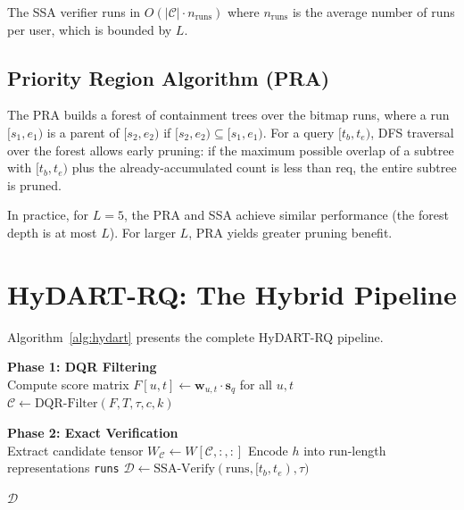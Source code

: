 The SSA verifier runs in $O(|\mathcal{C}| \cdot n_{\text{runs}})$ where $n_{\text{runs}}$ is the average number of runs per user, which is bounded by $L$.

\subsection{Priority Region Algorithm (PRA)}

The PRA builds a forest of containment trees over the bitmap runs, where a run $[s_1, e_1)$ is a parent of $[s_2, e_2)$ if $[s_2, e_2) \subseteq [s_1, e_1)$. For a query $[t_b, t_e)$, DFS traversal over the forest allows early pruning: if the maximum possible overlap of a subtree with $[t_b, t_e)$ plus the already-accumulated count is less than $\text{req}$, the entire subtree is pruned.

In practice, for $L = 5$, the PRA and SSA achieve similar performance (the forest depth is at most $L$). For larger $L$, PRA yields greater pruning benefit.

\section{HyDART-RQ: The Hybrid Pipeline}
\label{sec:hydart}

Algorithm~\ref{alg:hydart} presents the complete HyDART-RQ pipeline.

\begin{algorithm}[htbp]
\SetAlgoLined
\KwIn{$S$ (item matrix), $W$ (user tensor), query item $q$, params $k, \tau, c, [t_b, t_e)$, rank tables $T$}
\textbf{Phase 1: DQR Filtering}\\
Compute score matrix $F[u, t] \leftarrow \mathbf{w}_{u,t} \cdot \mathbf{s}_q$ for all $u, t$\;
$\mathcal{C} \leftarrow \text{DQR-Filter}(F, T, \tau, c, k)$ 

\BlankLine
\textbf{Phase 2: Exact Verification}\\
Extract candidate tensor $W_\mathcal{C} \leftarrow W[\mathcal{C}, :, :]$\;
\For{each window $t \in [t_b, t_e)$}{
  $\text{all\_scores}[t] \leftarrow W_\mathcal{C}[:,t,:] \cdot S^\top$ \tcp{shape $|\mathcal{C}| \times n_i$}
  $\text{kth}[t] \leftarrow$ $k$-th largest column value per row\;
  $h[:, t] \leftarrow (\text{all\_scores}[t][:, q] \geq \text{kth}[t])$
}
Encode $h$ into run-length representations \texttt{runs}\;
$\mathcal{D} \leftarrow \text{SSA-Verify}(\text{runs}, [t_b, t_e), \tau)$ 

\Return $\mathcal{D}$
\caption{HyDART-RQ: Hybrid Durable Approximate Reverse Top-$k$ Query}
\label{alg:hydart}
\end{algorithm}

